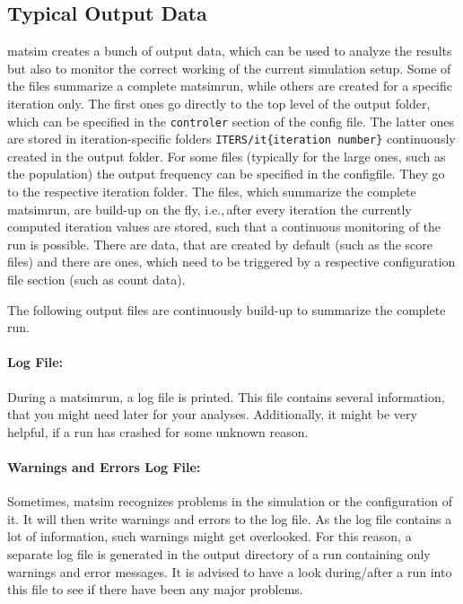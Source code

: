 \subsection{Typical Output Data}
\label{sec:outputdata}
\gls{matsim} creates a bunch of output data, which can be used to analyze the results but also to monitor the correct working of the current simulation setup. Some of the files summarize a complete \gls{matsimrun}, while others are created for a specific \gls{iteration} only. The first ones go directly to the top level of the output folder, which can be specified in the \lstinline|controler| section of the config file. The latter ones are stored in iteration-specific folders \lstinline|ITERS/it{iteration number}| continuously created in the output folder. For some files (typically for the large ones, such as the population) the output frequency can be specified in the \gls{configfile}. They go to the respective iteration folder. The files, which summarize the complete \gls{matsimrun}, are build-up on the fly, i.e.,\,after every iteration the currently computed iteration values are stored, such that a continuous monitoring of the run is possible. There are data, that are created by default (such as the score files) and there are ones, which need to be triggered by a respective configuration file section (such as count data).


The following output files are continuously build-up to summarize the complete run.

\paragraph{Log File:}
During a \gls{matsimrun}, a log file is printed. This file contains several information, that you might need later for your analyses. Additionally, it might be very helpful, if a run has crashed for some unknown reason. 

\paragraph{Warnings and Errors Log File:}
Sometimes, \gls{matsim} recognizes problems in the simulation or the configuration of it. It will then write warnings and errors to the log file. As the log file contains a lot of information, such warnings might get overlooked. For this reason, a separate log file is generated in the output directory of a run containing only warnings and error messages. It is advised to have a look during/after a run into this file to see if there have been any major problems.

